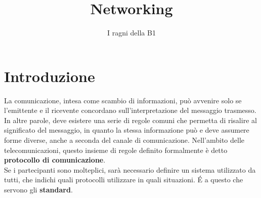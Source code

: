 \documentclass[a4paper,11pt]{article}
\title{Networking}
\author{I ragni della B1}
\begin{document}
\maketitle
\newpage
\tableofcontents
\newpage

\section{Introduzione}
La comunicazione, intesa come scambio di informazioni, può avvenire solo se l'emittente e il ricevente concordano sull'interpretazione del messaggio trasmesso. In altre parole, deve esistere una serie di regole comuni che permetta di risalire al significato del messaggio, in quanto la stessa informazione può e deve assumere forme diverse, anche a seconda del canale di comunicazione.
Nell'ambito delle telecomunicazioni, questo insieme di regole definito formalmente è detto \textbf{protocollo di comunicazione}. \\Se i partecipanti sono molteplici, sarà necessario definire un sistema utilizzato da tutti, che indichi quali protocolli utilizzare in quali situazioni. \'E a questo che servono gli \textbf{standard}.
\end{document}

